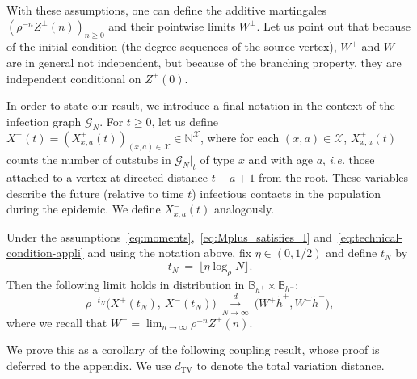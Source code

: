 \begin{refsegment}
With these assumptions, one can define the additive martingales
$(\rho^{-n}Z^\pm(n))_{n\geq 0}$ and their pointwise limits $W^{\pm}$.
Let us point out that because of the initial condition (the degree
sequences of the source vertex), $W^+$ and $W^-$ are in general not
independent, but because of the branching property, they are
independent conditional on $Z^\pm(0)$.

In order to state our result, we introduce a final notation in the
context of the infection graph $\mathcal{G}_N$. For $t\geq 0$, let us
define
$X^+(t)=(X^+_{x,a}(t))_{(x,a)\in\mathcal{X}} \in
\mathbb{N}^\mathcal{X}$, where for each $(x,a)\in \mathcal{X}$,
$X^+_{x,a}(t)$ counts the number of outstubs in $\mathcal{G}_N|_{t}$
of type $x$ and with age $a$, \textit{i.e.} those attached to a vertex at
directed distance $t-a+1$ from the root. These variables describe the
future (relative to time $t$) infectious contacts in the population
during the epidemic. We define $X^-_{x,a}(t)$ analogously.

\begin{thm}\label{thm:application}
  Under the
  assumptions~\eqref{eq:moments},~\eqref{eq:Mplus_satisfies_I}
  and~\eqref{eq:technical-condition-appli} and using the
  notation above, fix $\eta \in (0,1/2)$ and define $t_N$ by
  \begin{equation*}
    t_N\ =\  \big\lfloor \eta\log_{\rho} N\big\rfloor.
  \end{equation*}
  Then the following limit holds in distribution in
  $\mathbb{B}_{h^+}\times \mathbb{B}_{h^-}$:
  \[
    \rho^{-t_N}\big(X^+(t_N),\ X^-(t_N)\big)\
    \overset{d}{\underset{N\to\infty}{\longrightarrow}} \
    \big(W^+\tilde h^{+}, W^-\tilde h^{-}\big),
  \]
where we recall that $W^\pm=\lim_{n\to\infty}\rho^{-n}Z^\pm(n)$.
\end{thm}
We prove this as a corollary of the following coupling result, whose proof is deferred to the appendix.
We use $d_{\mathrm{TV}}$ to denote the total variation distance.


\end{refsegment}
